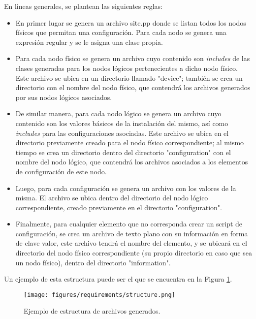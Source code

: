 En lineas generales, se plantean las siguientes reglas:
\begin{itemize}
    \item En primer lugar se genera un archivo site.pp donde se listan todos los nodos físicos que permitan una configuración. Para cada nodo se genera una expresión regular y se le asigna una clase propia.
    \item Para cada nodo físico se genera un archivo cuyo contenido son \textit{includes} de las clases generadas para los nodos lógicos pertenecientes a dicho nodo físico. Este archivo se ubica en un directorio llamado "device"; también se crea un directorio con el nombre del nodo físico, que contendrá los archivos generados por sus nodos lógicos asociados.
    \item De similar manera, para cada nodo lógico se genera un archivo cuyo contenido son los valores básicos de la instalación del mismo, así como \textit{includes} para las configuraciones asociadas. Este archivo se ubica en el directorio previamente creado para el nodo físico correspondiente; al mismo tiempo se crea un directorio dentro del directorio "configuration" con el nombre del nodo lógico, que contendrá los archivos asociados a los elementos de configuración de este nodo.
    \item Luego, para cada configuración se genera un archivo con los valores de la misma. El archivo se ubica dentro del directorio del nodo lógico correspondiente, creado previamente en el directorio "configuration".
    \item Finalmente, para cualquier elemento que no corresponda crear un script de configuración, se crea un archivo de texto plano con su información en forma de clave valor, este archivo tendrá el nombre del elemento, y se ubicará en el directorio del nodo físico correspondiente (su propio directorio en caso que sea un nodo físico), dentro del directorio "information".
\end{itemize}

Un ejemplo de esta estructura puede ser el que se encuentra en la Figura \ref{fig:requirements:file_structure}.

\begin{figure}[H]
    \centering
    \texttt{[image: figures/requirements/structure.png]}
    \caption{Ejemplo de estructura de archivos generados.}
    \label{fig:requirements:file_structure}
\end{figure}




